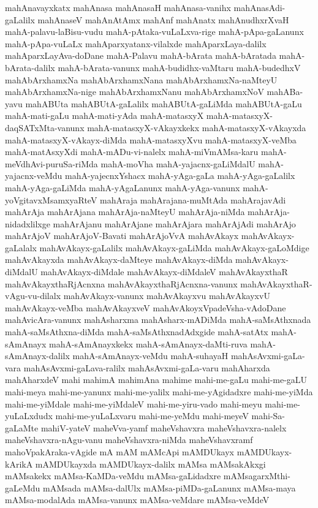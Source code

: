 {mahAnavayxkatx
mahAnasa
mahAnasaH
mahAnasa-vanihx
mahAnasAdi-gaLalilx
mahAnaseV
mahAnAtAmx
mahAnf
mahAnatx
mahAnudhxrXvaH
mahA-palavu-laBisu-vudu
mahA-pAtaka-vuLaLxva-rige
mahA-pApa-gaLanunx
mahA-pApa-vuLaLx
mahAparxyatanx-vilalxde
mahAparxLaya-dalilx
mahAparxLayAva-doDane
mahA-Palavu
mahA-bArata
mahA-bAratada
mahA-bArata-dalilx
mahA-bArata-vanunx
mahA-budidhx-vaMtaru
mahA-budedhxV
mahAbArxhamxNa
mahAbArxhamxNana
mahAbArxhamxNa-naMteyU
mahAbArxhamxNa-nige
mahAbArxhamxNanu
mahAbArxhamxNoV
mahABa-yavu
mahABUta
mahABUtA-gaLalilx
mahABUtA-gaLiMda
mahABUtA-gaLu
mahA-mati-gaLu
mahA-mati-yAda
mahA-matasxyX
mahA-matasxyX-daqSATxMta-vanunx
mahA-matasxyX-vAkayxkekx
mahA-matasxyX-vAkayxda
mahA-matasxyX-vAkayx-diMda
mahA-matasxyXvu
mahA-matasxyX-veMba
mahA-matAsxyXdi
mahA-mADu-vi-nalelx
mahA-miVmAMsa-karu
mahA-meVdhAvi-puruSa-riMda
mahA-moVha
mahA-yajacnx-gaLiMdalU
mahA-yajacnx-veMdu
mahA-yajecnxYshacx
mahA-yAga-gaLa
mahA-yAga-gaLalilx
mahA-yAga-gaLiMda
mahA-yAgaLanunx
mahA-yAga-vanunx
mahA-yoVgitavxMsamxyaRteV
mahAraja
mahArajana-muMtAda
mahArajavAdi
mahArAja
mahArAjana
mahArAja-naMteyU
mahArAja-niMda
mahArAja-nidadxlilxge
mahArAjanu
mahArAjane
mahArAjara
mahArAjAdi
mahArAjo
mahArAjoV
mahArAjoV-Bavati
mahArAjoVvA
mahAvAkayx
mahAvAkayx-gaLalalx
mahAvAkayx-gaLalilx
mahAvAkayx-gaLiMda
mahAvAkayx-gaLoMdige
mahAvAkayxda
mahAvAkayx-daMteye
mahAvAkayx-diMda
mahAvAkayx-diMdalU
mahAvAkayx-diMdale
mahAvAkayx-diMdaleV
mahAvAkayxthaR
mahAvAkayxthaRjAcnxna
mahAvAkayxthaRjAcnxna-vanunx
mahAvAkayxthaR-vAgu-vu-dilalx
mahAvAkayx-vanunx
mahAvAkayxvu
mahAvAkayxvU
mahAvAkayx-veMba
mahAvAkayxveV
mahAvAkoyxVpadeVsha-vAdoDane
mahAvicAra-vanunx
mahAsharxma
mahAsharx-mADiMda
mahA-saMsAthxnada
mahA-saMsAthxna-diMda
mahA-saMsAthxnadAdxgide
mahA-satAtx
mahA-sAmAnayx
mahA-sAmAnayxkekx
mahA-sAmAnayx-daMti-ruva
mahA-sAmAnayx-dalilx
mahA-sAmAnayx-veMdu
mahA-suhayaH
mahAsAvxmi-gaLa-vara
mahAsAvxmi-gaLava-ralilx
mahAsAvxmi-gaLa-varu
mahAharxda
mahAharxdeV
mahi
mahimA
mahimAna
mahime
mahi-me-gaLu
mahi-me-gaLU
mahi-meya
mahi-me-yanunx
mahi-me-yalilx
mahi-me-yAgidadxre
mahi-me-yiMda
mahi-me-yiMdale
mahi-me-yiMdaleV
mahi-me-yiru-vado
mahi-meyu
mahi-me-yuLaLxdudx
mahi-me-yuLaLxvaru
mahi-me-yeMdu
mahi-meyeV
mahi-Sa-gaLaMte
mahiV-yateV
maheVva-yamf
maheVshavxra
maheVshavxra-nalelx
maheVshavxra-nAgu-vanu
maheVshavxra-niMda
maheVshavxramf
mahoVpakAraka-vAgide
mA
mAM
mAMcApi
mAMDUkayx
mAMDUkayx-kArikA
mAMDUkayxda
mAMDUkayx-dalilx
mAMsa
mAMsakAkxgi
mAMsakekx
mAMsa-KaMDa-veMdu
mAMsa-gaLidadxre
mAMsagarxMthi-gaLeMdu
mAMsada
mAMsa-dalUlx
mAMsa-piMDa-gaLanunx
mAMsa-maya
mAMsa-modalAda
mAMsa-vanunx
mAMsa-veMdare
mAMsa-veMdeV
}

